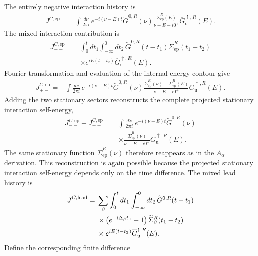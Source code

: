 \documentclass[
 reprint,
 superscriptaddress,
 amsmath,amssymb,
 aps,prb,
 longbibliography,
 floatfix
]{revtex4-2}
\newcommand{\ep}{\mathrm{ep}}
\newcommand{\barSigma}{\overline{\Sigma}}
\begin{document}
The entirely negative interaction history is
\begin{equation*}
\begin{aligned}
J_{--}^{C,\ep}
={}&
\int\frac{d\nu}{2\pi i}\,
e^{-i(\nu-E)t}
\widetilde G^{0,R}(\nu)
\frac{\barSigma_{\ep}^R(E)}
{\nu-E-i0^+}
\overline G_{\mathrm u}^{\uparrow,R}(E).
\end{aligned}
\end{equation*}
The mixed interaction contribution is
\begin{align*}
J_{+-}^{C,\ep}
={}&
\int_0^t dt_1
\int_{-\infty}^{0}dt_2\,
\widetilde G^{0,R}(t-t_1)
\barSigma_{\ep}^R(t_1-t_2)
\\
&\times
e^{iE(t-t_2)}
\overline G_{\mathrm u}^{\uparrow,R}(E).
\end{align*}
Fourier transformation and evaluation of the internal-energy contour give
\begin{equation*}
\begin{aligned}
J_{+-}^{C,\ep}
={}&
\int\frac{d\nu}{2\pi i}\,
e^{-i(\nu-E)t}
\widetilde G^{0,R}(\nu)
\frac{
\barSigma_{\ep}^R(\nu)
-
\barSigma_{\ep}^R(E)}
{\nu-E-i0^+}
\overline G_{\mathrm u}^{\uparrow,R}(E).
\end{aligned}
\end{equation*}
Adding the two stationary sectors reconstructs the complete projected stationary interaction self-energy,
\begin{equation*}
\begin{aligned}
J_{--}^{C,\ep}
+
J_{+-}^{C,\ep}
={}&
\int\frac{d\nu}{2\pi i}\,
e^{-i(\nu-E)t}
\widetilde G^{0,R}(\nu)
\\
&\times
\frac{\barSigma_{\ep}^R(\nu)}
{\nu-E-i0^+}
\overline G_{\mathrm u}^{\uparrow,R}(E).
\end{aligned}
\end{equation*}
The same stationary function $\barSigma_{\ep}^R(\nu)$ therefore reappears as in the $A_\alpha$ derivation. This reconstruction is again possible because the projected stationary interaction self-energy depends only on the time difference. The mixed lead history is
\begin{align*}
J_{+-}^{C,\rm lead}
={}&
\sum_\beta
\int_0^t dt_1
\int_{-\infty}^{0}dt_2\,
\widetilde G^{0,R}(t-t_1)
\\
&\times
\left(e^{-i\Delta_\beta t_1}-1\right)
\widetilde\Sigma_\beta^R(t_1-t_2)
\\
&\times
e^{iE(t-t_2)}
\overline G_{\mathrm u}^{\uparrow,R}(E).
\end{align*}
Define the corresponding finite difference
\end{document}

